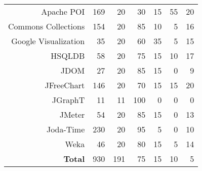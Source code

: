 {\begin{tabular}{r@{\quad}
         r
         r
         r
         r
         r
         r
         }
                  Apache POI & 169 & 20 & 30 & 15 & 55 & 20 \\
         Commons Collections & 154 & 20 & 85 & 10 & 5 & 16 \\
         Google Visualization & 35 & 20 & 60 & 35 & 5 & 15 \\
         HSQLDB & 58 & 20 & 75 & 15 & 10 & 17 \\[0.5em]
         JDOM & 27 & 20 & 85 & 15 & 0 & 9 \\
         JFreeChart & 146 & 20 & 70 & 15 & 15 & 20 \\
         JGraphT & 11 & 11 & 100 & 0 & 0 & 0 \\
         JMeter & 54 & 20 & 85 & 15 & 0 & 13 \\[0.5em]
         Joda-Time & 230 & 20 & 95 & 5 & 0 & 10 \\
         Weka & 46 & 20 & 80 & 15 & 5 & 14 \\[0.7em]
         {\bf Total} & 930 & 191 & 75 & 15 & 10 & 5 \\
         
      \end{tabular}

   }
\notslides{\end{table*}}
